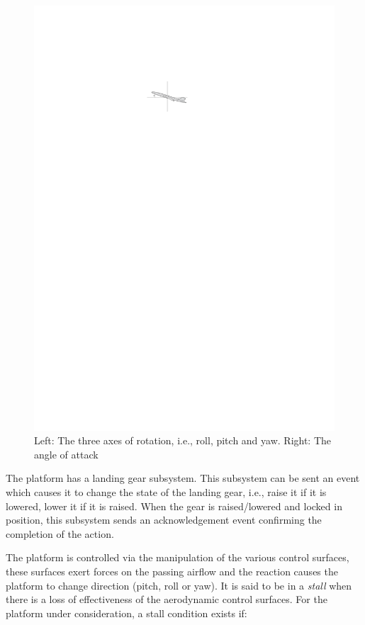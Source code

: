 \begin{figure}
\includegraphics[scale=2]{figs/aoa}
\caption{Left: The three axes of rotation, i.e., roll, pitch and
  yaw. Right: The angle of attack}
\label{fig:aero}
\end{figure}

The platform has a landing gear subsystem. This subsystem can be sent
an event which causes it to change the state of the landing gear,
i.e., raise it if it is lowered, lower it if it is raised. When the
gear is raised/lowered and locked in position, this subsystem sends an
acknowledgement event confirming the completion of the action.

The platform is controlled via the manipulation of the various control
surfaces, these surfaces exert forces on the passing airflow and the
reaction causes the platform to change direction (pitch, roll or
yaw). It is said to be in a \emph{stall} when there is a loss of
effectiveness of the aerodynamic control surfaces. For the platform
under consideration, a stall condition exists if:

